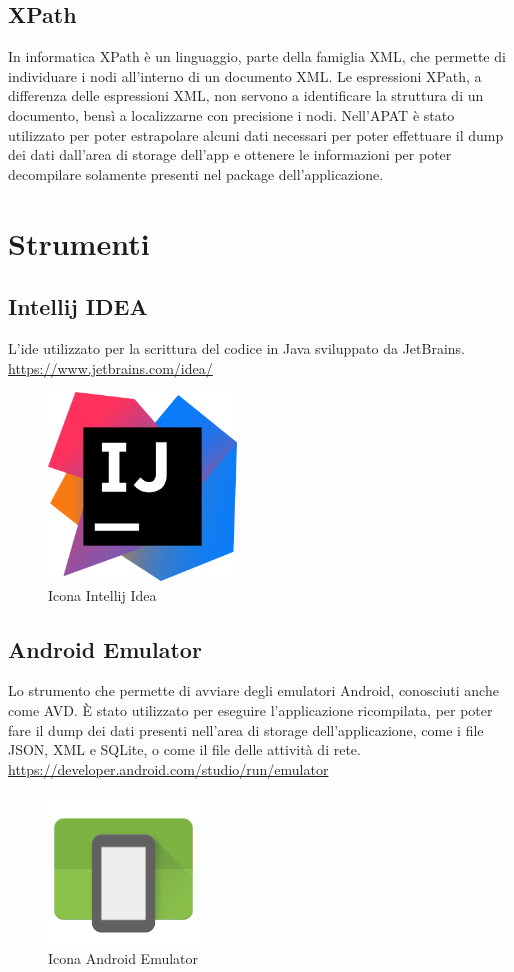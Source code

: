 \subsection*{XPath}\label{subsec:xpath}
In informatica XPath è un linguaggio, parte della famiglia XML, che permette di individuare i nodi all'interno di un documento XML. Le espressioni XPath, a differenza delle espressioni XML, non servono a identificare la struttura di un documento, bensì a localizzarne con precisione i nodi.
Nell'APAT è stato utilizzato per poter estrapolare alcuni dati necessari per poter effettuare il dump dei dati dall'area di storage dell'app e ottenere le informazioni per poter decompilare solamente presenti nel package dell'applicazione.


\section{Strumenti}\label{sec:strumenti}

\subsection*{Intellij IDEA}
L'\gls{ide} utilizzato per la scrittura del codice in Java sviluppato da JetBrains.
\url{https://www.jetbrains.com/idea/}
\begin{figure}[H]
    \centering
    \includegraphics[width=5cm, height=5cm]{./immagini/intellij.png}
    \caption{Icona Intellij Idea}\label{fig:intellij}
\end{figure}

\subsection*{Android Emulator}
Lo strumento che permette di avviare degli emulatori Android, conosciuti anche come AVD. È stato utilizzato per eseguire l'applicazione ricompilata, per poter fare il dump dei dati presenti nell'area di storage dell'applicazione, come i file JSON, XML e SQLite, o come il file delle attività di rete.
\url{https://developer.android.com/studio/run/emulator}
\begin{figure}[H]
    \centering
    \includegraphics[width=4cm, height=4cm]{./immagini/emulator.png}
    \caption{Icona Android Emulator}\label{fig:emulator}
\end{figure}

